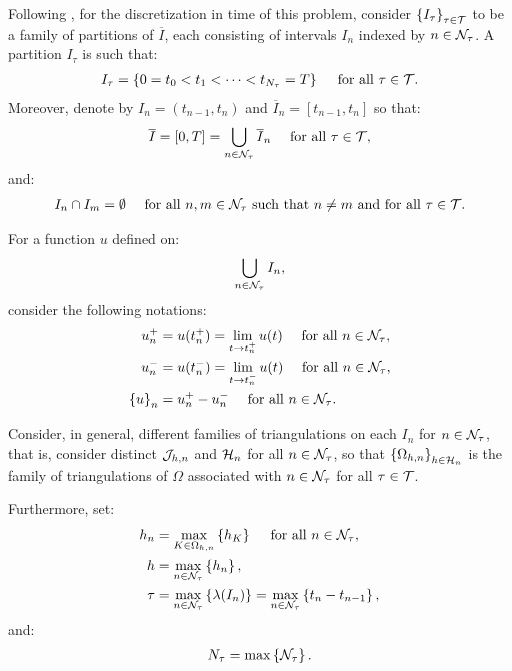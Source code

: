 Following \cite{Feistauer2007}, for the discretization in time of this problem, consider $\left\{ I_{\tau} \right\}_{\tau \in \mathcal{T}}$ to be a family of partitions of $\overline{I}$, each consisting of intervals $I_n$ indexed by $n \in \mathcal{N}_{\tau}$. A partition $I_{\tau}$ is such that:
\begin{gather}
    I_{\tau} = \left\{ 0 = t_0 < t_1 < \dots < t_{N_\tau} = T \right\} \quad \text{ for all } \tau \in \mathcal{T}.
\end{gather}
Moreover, denote by $I_n = \left( t_{n - 1}, t_n \right)$ and $\overline{I}_n = \left[ t_{n - 1}, t_n \right]$ so that:
\begin{gather}
    \overline{I} = \left[ 0, T \right] = \bigcup_{n \in \mathcal{N}_{\tau}} \overline{I}_n \quad \text{ for all } \tau \in \mathcal{T},
\end{gather}
and:
\begin{gather}
    I_n \cap I_m = \emptyset \quad \text{ for all } n, m \in \mathcal{N}_{\tau} \text{ such that } n \neq m \text{ and for all } \tau \in \mathcal{T}.
\end{gather}

For a function $u$ defined on:
\begin{gather}
    \bigcup_{n \in \mathcal{N}_{\tau}} I_n,
\end{gather}
consider the following notations:
\begin{align}
    u_n^+ &= u(t_n^+) = \lim_{t \rightarrow t_n^+} u(t) \quad \text{ for all } n \in \mathcal{N}_{\tau}, \\
    u_n^- &= u(t_n^-) = \lim_{t \rightarrow t_n^-} u(t) \quad \text{ for all } n \in \mathcal{N}_{\tau}, \\
    \left\{ u \right\}_n &= u_n^+ - u_n^- \quad \text{ for all } n \in \mathcal{N}_{\tau}.
\end{align}

Consider, in general, different families of triangulations on each $I_n$ for $n \in \mathcal{N}_{\tau}$, that is, consider distinct $\mathcal{J}_{h, n}$ and $\mathcal{H}_n$ for all $n \in \mathcal{N}_{\tau}$, so that $\left\{ \Omega_{h, n} \right\}_{h \in \mathcal{H}_n}$ is the family of triangulations of $\Omega$ associated with $n \in \mathcal{N}_{\tau}$ for all $\tau \in \mathcal{T}$.

Furthermore, set:
\begin{align}
    h_n &= \max_{K \in \Omega_{h, n}} \left\{ h_K \right\} \quad \text{ for all } n \in \mathcal{N}_{\tau}, \\
    h &= \max_{n \in \mathcal{N}_{\tau}} \left\{ h_n \right\}, \\
    \tau &= \max_{n \in \mathcal{N}_{\tau}} \left\{ \lambda(I_n) \right\} = \max_{n \in \mathcal{N}_{\tau}} \left\{ t_n - t_{n - 1} \right\},
\end{align}
and:
\begin{align}
    N_{\tau} = \max \left\{ \mathcal{N}_{\tau} \right\}.
\end{align}

